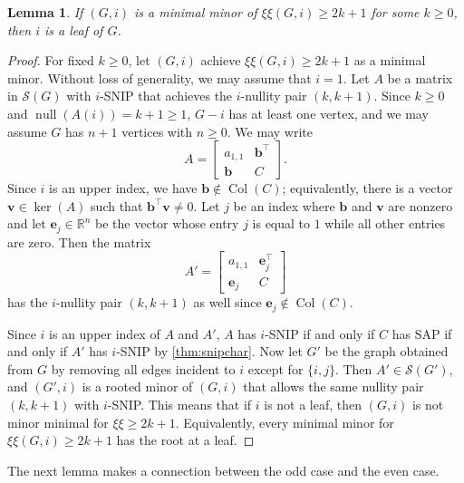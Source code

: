 \documentclass{article}
\newtheorem{lemma}[theorem]{Lemma}
\theoremstyle{definition}
\newcommand{\trans}{^\top}
\newcommand{\bb}{\mathbf{b}}
\newcommand{\be}{\mathbf{e}}
\newcommand{\bv}{\mathbf{v}}
\newcommand{\nul}{\operatorname{null}}
\newcommand{\Col}{\operatorname{Col}}
\newcommand{\mptn}{\mathcal{S}} %
\newcommand{\excise}{\xi\xi}
\begin{document}
\begin{lemma}
\label{lem:oddleaf}
If $(G,i)$ is a minimal minor of $\excise(G, i) \geq 2k + 1$ for some $k \geq 0$, then $i$ is a leaf of $G$.
\end{lemma}
\begin{proof}
For fixed $k \geq 0$, let $(G,i)$ achieve $\excise(G, i) \geq 2k + 1$ as a minimal minor.
Without loss of generality, we may assume that $i = 1$.  Let $A$ be a matrix in $\mptn(G)$ with $i$-SNIP that achieves the $i$-nullity pair $(k,k+1)$.  Since $k \geq 0$ and $\nul(A(i)) = k + 1 \geq 1$, $G - i$ has at least one vertex, and we may assume $G$ has $n + 1$ vertices with $n \geq 0$.  We may write  
\[
    A = \begin{bmatrix}
    a_{1,1} & \bb\trans \\
    \bb & C
    \end{bmatrix}.
\]
Since $i$ is an upper index, we have $\bb\notin\Col(C)$; equivalently, there is a vector $\bv\in\ker(A)$ such that $\bb\trans\bv \neq 0$.  Let $j$ be an index where $\bb$ and $\bv$ are nonzero and let $\be_j\in\mathbb{R}^{n}$ be the vector whose entry $j$ is equal to $1$ while all other entries are zero.  Then the matrix  
\[
    A' = \begin{bmatrix}
    a_{1,1} & \be_j\trans \\
    \be_j & C
    \end{bmatrix}
\]
has the $i$-nullity pair $(k,k+1)$ as well since $\be_j\notin\Col(C)$.  

Since $i$ is an upper index of $A$ and $A'$, $A$ has $i$-SNIP if and only if $C$ has SAP if and only if $A'$ has $i$-SNIP by \cref{thm:snipchar}.  Now let $G'$ be the graph obtained from $G$ by removing all edges incident to $i$ except for $\{i,j\}$.  Then $A'\in\mptn(G')$, and $(G',i)$ is a rooted minor of $(G,i)$ that allows the same nullity pair $(k,k+1)$ with $i$-SNIP.  This means that if $i$ is not a leaf, then $(G,i)$ is not minor minimal for $\excise \geq 2k + 1$.  Equivalently, every minimal minor for $\excise(G, i) \geq 2k + 1$ has the root at a leaf.
\end{proof}

The next lemma makes a connection between the odd case and the even case.
\end{document}
